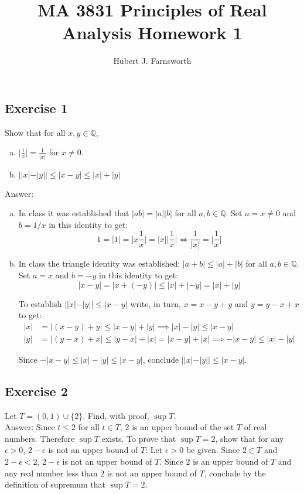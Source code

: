 \documentclass{article}
\title{MA 3831 Principles of Real Analysis Homework 1}
\author{Hubert J. Farnsworth}
\begin{document}
\maketitle


\subsection*{Exercise 1}
Show that for all $x,y \in \mathbb{Q}$,
\begin{enumerate}[a)]
\item
$\big\lvert \frac{1}{x} \big\rvert = \frac{1}{|x|}$ for $x \neq 0$. 

\item
$||x| - |y|| \leq |x-y| \leq |x| + |y|$ \\
\end{enumerate}

Answer:
\begin{enumerate}[a)]
\item
In class it was established that $|ab| = |a||b|$ for all $a,b \in \mathbb{Q}$. Set $a = x \neq 0$ and $b = 1/x$ in this identity to get:
$$
1 = |1| = \biggr\lvert x \frac{1}{x} \biggr\rvert = |x|\biggr\lvert \frac{1}{x} \biggr\rvert \iff \frac{1}{|x|} = \biggr\lvert \frac{1}{x} \biggr\rvert
$$

\item
In class the triangle identity was established: $|a+b| \leq |a| + |b|$ for all $a,b \in \mathbb{Q}$. Set $a = x$ and $b = -y$ in this identity to get: 
$$|x-y| = |x + (-y)| \leq |x| + |-y| = |x|+|y|$$

To establish $||x| - |y|| \leq |x-y|$ write, in turn, $x = x-y + y$ and $y = y-x+x$ to get:
\begin{align*}
|x| &= |(x-y) + y| \leq |x-y| + |y| \implies |x|-|y| \leq |x-y| \\
|y| &= |(y-x) + x| \leq |y-x| + |x| = |x-y| + |x| \implies -|x-y| \leq |x| - |y|
\end{align*}

Since $-|x-y| \leq |x|-|y| \leq |x-y|$, conclude $||x|-|y|| \leq |x-y|$.
\end{enumerate}

\subsection*{Exercise 2}
Let $T = (0,1) \cup \{2\}$. Find, with proof, $\sup T$. \\

Answer: Since $t \leq 2$ for all $t \in T$, 2 is an upper bound of the set $T$ of real numbers. Therefore $\sup T$ exists. To prove that $\sup T = 2$, show that for any $\epsilon > 0$, $2-\epsilon$ is not an upper bound of $T$: Let $\epsilon > 0$ be given. Since $2 \in T$ and $2-\epsilon < 2$, $2-\epsilon$ is not an upper bound of $T$. Since $2$ is an upper bound of $T$ and any real number less than $2$ is not an upper bound of $T$, conclude by the definition of supremum that $\sup T = 2$. 
\end{document}
